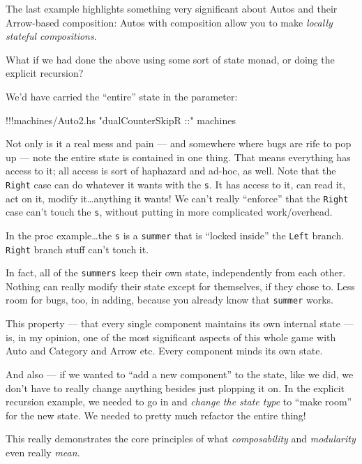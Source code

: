 \documentclass[]{article}
\newenvironment{Shaded}{}{}
\newcommand{\StringTok}[1]{\textcolor[rgb]{0.25,0.44,0.63}{{#1}}}
\newcommand{\FunctionTok}[1]{\textcolor[rgb]{0.02,0.16,0.49}{{#1}}}
\newcommand{\NormalTok}[1]{{#1}}
\begin{document}
The last example highlights something very significant about Autos and
their Arrow-based composition: Autos with composition allow you to make
\emph{locally stateful compositions}.

What if we had done the above using some sort of state monad, or doing
the explicit recursion?

We'd have carried the ``entire'' state in the parameter:

\begin{Shaded}
\begin{Highlighting}[]
\FunctionTok{!!!}\NormalTok{machines}\FunctionTok{/}\NormalTok{Auto2.hs }\StringTok{"dualCounterSkipR ::"} \NormalTok{machines}
\end{Highlighting}
\end{Shaded}

Not only is it a real mess and pain --- and somewhere where bugs are
rife to pop up --- note the entire state is contained in one thing. That
means everything has access to it; all access is sort of haphazard and
ad-hoc, as well. Note that the \texttt{Right} case can do whatever it
wants with the \texttt{s}. It has access to it, can read it, act on it,
modify it\ldots{}anything it wants! We can't really ``enforce'' that the
\texttt{Right} case can't touch the \texttt{s}, without putting in more
complicated work/overhead.

In the proc example\ldots{}the \texttt{s} is a \texttt{summer} that is
``locked inside'' the \texttt{Left} branch. \texttt{Right} branch stuff
can't touch it.

In fact, all of the \texttt{summers} keep their own state, independently
from each other. Nothing can really modify their state except for
themselves, if they chose to. Less room for bugs, too, in adding,
because you already know that \texttt{summer} works.

This property --- that every single component maintains its own internal
state --- is, in my opinion, one of the most significant aspects of this
whole game with Auto and Category and Arrow etc. Every component minds
its own state.

And also --- if we wanted to ``add a new component'' to the state, like
we did, we don't have to really change anything besides just plopping it
on. In the explicit recursion example, we needed to go in and
\emph{change the state type} to ``make room'' for the new state. We
needed to pretty much refactor the entire thing!

This really demonstrates the core principles of what
\emph{composability} and \emph{modularity} even really \emph{mean}.
\end{document}
